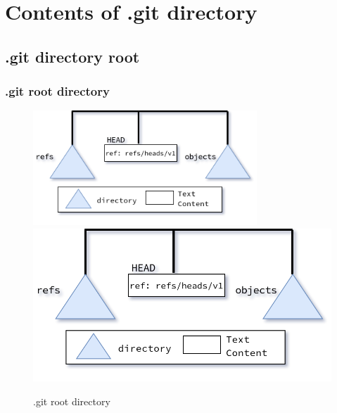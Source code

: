 \section{Contents of .git directory}
\subsection*{.git directory root}
\begin{frame}[fragile]
    \frametitle{.git root directory}
    \begin{figure}
        \begin{center}
            {
                \includegraphics[width=0.75\textwidth,keepaspectratio]{./images/gitDirectory-Root.png}
            }
            {
                \includegraphics[height=0.75\textheight,keepaspectratio]{./images/gitDirectory-Root.png}
            }
            \caption{.git root directory}
        \end{center}
    \end{figure}
\end{frame}


